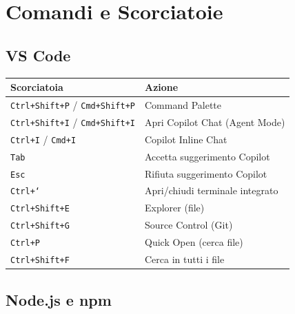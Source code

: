 \chapter{Comandi e Scorciatoie}

\section{VS Code}

\begin{center}
\begin{tabularx}{\textwidth}{l X}
\toprule
\textbf{Scorciatoia} & \textbf{Azione} \\
\midrule
\texttt{Ctrl+Shift+P} / \texttt{Cmd+Shift+P} & Command Palette \\
\texttt{Ctrl+Shift+I} / \texttt{Cmd+Shift+I} & Apri Copilot Chat (Agent Mode) \\
\texttt{Ctrl+I} / \texttt{Cmd+I} & Copilot Inline Chat \\
\texttt{Tab} & Accetta suggerimento Copilot \\
\texttt{Esc} & Rifiuta suggerimento Copilot \\
\texttt{Ctrl+`} & Apri/chiudi terminale integrato \\
\texttt{Ctrl+Shift+E} & Explorer (file) \\
\texttt{Ctrl+Shift+G} & Source Control (Git) \\
\texttt{Ctrl+P} & Quick Open (cerca file) \\
\texttt{Ctrl+Shift+F} & Cerca in tutti i file \\
\bottomrule
\end{tabularx}
\end{center}

\section{Node.js e npm}


